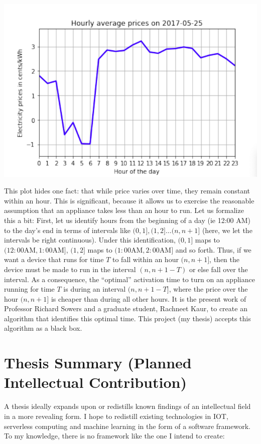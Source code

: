 \documentclass[a4paper]{article}
\begin{document}
    \includegraphics[width=0.7\paperwidth,height=0.7\paperheight,keepaspectratio]{../pictures/average_hourly_prices}

This plot hides one fact: that while price varies over time, they remain constant within an hour. This is significant, because it allows us to exercise the reasonable assumption that an appliance takes less than an hour to run. Let us formalize this a bit:
First, let us identify hours from the beginning of a day (ie 12:00 AM) to the day's end in terms of intervals like $(0,1], (1,2] \dots (n, n+1]$ (here, we let the intervals be right continuous). Under this identification, $(0,1]$ maps to $(12:00 \text{AM}, 1:00\text{AM}]$, $(1,2]$ maps to $(1:00 \text{AM}, 2:00\text{AM}]$ and so forth. Thus, if we want a device that runs for time $T$ to fall within an hour $(n, n+1]$, then the device must be made to run in the interval $(n, n+1 -T)$ or else fall over the interval. As a consequence, the ``optimal'' activation time to turn on an appliance running for time $T$ is during an interval $(n, n+1 - T]$, where the price over the hour $(n, n+1]$ is cheaper than during all other hours. It is the present work of Professor Richard Sowers and a graduate student, Rachneet Kaur, to create an algorithm that identifies this optimal time. This project (my thesis) accepts this algorithm as a black box.

\newpage


\section{Thesis Summary (Planned Intellectual Contribution)} 
A thesis ideally expands upon or redistills known findings of an intellectual field in a more revealing form. I hope to redistill existing technologies in IOT, serverless computing and machine learning in the form of a software framework. To my knowledge, there is no framework like the one I intend to create: \\
\end{document}
